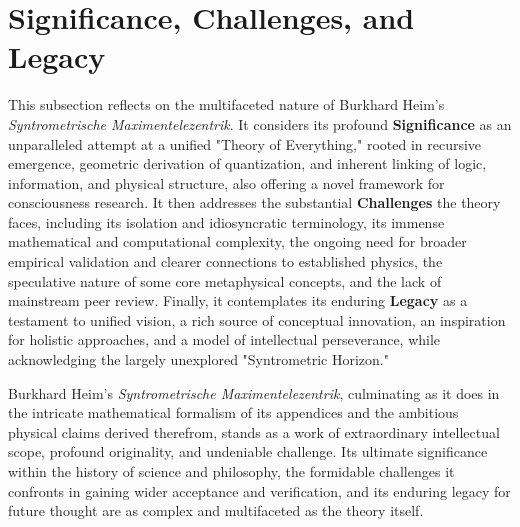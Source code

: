 \documentclass[
    12pt,              %
    a4paper,           %
    headings=normal,   %
    twoside=true,      %
    BCOR=8mm,          %
]{scrbook}
\begin{document}
\section{Significance, Challenges, and Legacy}
\label{sec:significance_challenges_legacy}
This subsection reflects on the multifaceted nature of Burkhard Heim’s \textit{Syntrometrische Maximentelezentrik}. It considers its profound \textbf{Significance} as an unparalleled attempt at a unified "Theory of Everything," rooted in recursive emergence, geometric derivation of quantization, and inherent linking of logic, information, and physical structure, also offering a novel framework for consciousness research. It then addresses the substantial \textbf{Challenges} the theory faces, including its isolation and idiosyncratic terminology, its immense mathematical and computational complexity, the ongoing need for broader empirical validation and clearer connections to established physics, the speculative nature of some core metaphysical concepts, and the lack of mainstream peer review. Finally, it contemplates its enduring \textbf{Legacy} as a testament to unified vision, a rich source of conceptual innovation, an inspiration for holistic approaches, and a model of intellectual perseverance, while acknowledging the largely unexplored "Syntrometric Horizon."

Burkhard Heim’s \textit{Syntrometrische Maximentelezentrik}, culminating as it does in the intricate mathematical formalism of its appendices and the ambitious physical claims derived therefrom, stands as a work of extraordinary intellectual scope, profound originality, and undeniable challenge. Its ultimate significance within the history of science and philosophy, the formidable challenges it confronts in gaining wider acceptance and verification, and its enduring legacy for future thought are as complex and multifaceted as the theory itself.
\end{document}
